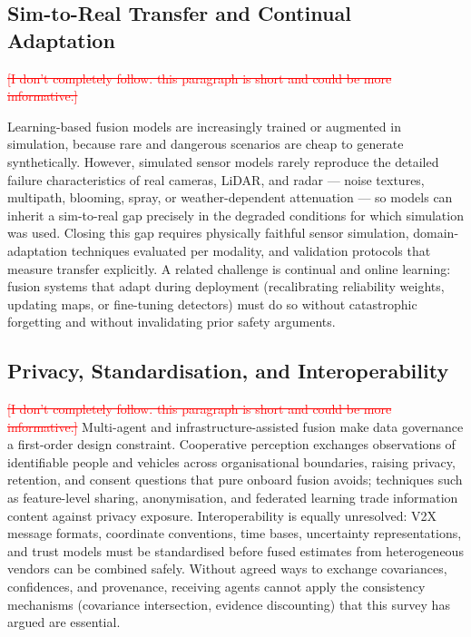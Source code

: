 \documentclass{ieeeaccess}
\newcommand{\deleted}[1]{\textcolor{red}{\sout{#1}}}
\begin{document}
{\color{blue}
\subsection{Sim-to-Real Transfer and Continual Adaptation}

\deleted{[I don't completely follow. this paragraph is short and could be more informative.]} %

Learning-based fusion models are increasingly trained or augmented in simulation, because rare and dangerous scenarios are cheap to generate synthetically. However, simulated sensor models rarely reproduce the detailed failure characteristics of real cameras, LiDAR, and radar --- noise textures, multipath, blooming, spray, or weather-dependent attenuation --- so models can inherit a sim-to-real gap precisely in the degraded conditions for which simulation was used. Closing this gap requires physically faithful sensor simulation, domain-adaptation techniques evaluated per modality, and validation protocols that measure transfer explicitly. A related challenge is continual and online learning: fusion systems that adapt during deployment (recalibrating reliability weights, updating maps, or fine-tuning detectors) must do so without catastrophic forgetting and without invalidating prior safety arguments.

\subsection{Privacy, Standardisation, and Interoperability}
\deleted{[I don't completely follow. this paragraph is short and could be more informative.]} %
Multi-agent and infrastructure-assisted fusion make data governance a first-order design constraint. Cooperative perception exchanges observations of identifiable people and vehicles across organisational boundaries, raising privacy, retention, and consent questions that pure onboard fusion avoids; techniques such as feature-level sharing, anonymisation, and federated learning trade information content against privacy exposure. Interoperability is equally unresolved: V2X message formats, coordinate conventions, time bases, uncertainty representations, and trust models must be standardised before fused estimates from heterogeneous vendors can be combined safely. Without agreed ways to exchange covariances, confidences, and provenance, receiving agents cannot apply the consistency mechanisms (covariance intersection, evidence discounting) that this survey has argued are essential.
}
\end{document}
